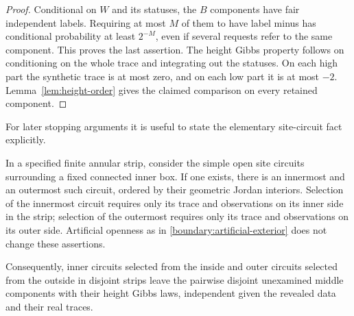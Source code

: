 \begin{proof}
Conditional on $W$ and its statuses, the $B$ components have fair
independent labels.  Requiring at most $M$ of them to have label minus
has conditional probability at least $2^{-M}$, even if several
requests refer to the same component.  This proves the last
assertion.  The height Gibbs property follows on conditioning on the
whole trace and integrating out the statuses.  On each high part
the synthetic trace is at most zero, and on each low part it is at
most $-2$.  Lemma~\ref{lem:height-order} gives the claimed comparison
on every retained component.
\end{proof}

For later stopping arguments it is useful to state the elementary
site-circuit fact explicitly.

\begin{lemma}\label{boundary:extremal}
In a specified finite annular strip, consider the simple open site
circuits surrounding a fixed connected inner box.  If one exists,
there is an innermost and an outermost such circuit, ordered by their
geometric Jordan interiors.  Selection of the innermost circuit
requires only its trace and observations on its inner side in the
strip; selection of the outermost requires only its trace and
observations on its outer side.  Artificial openness as in
\eqref{boundary:artificial-exterior} does not change these assertions.

Consequently, inner circuits selected from the inside and outer
circuits selected from the outside in disjoint strips leave the
pairwise disjoint unexamined middle components with their height Gibbs laws, independent
given the revealed data and their real traces.
\end{lemma}

